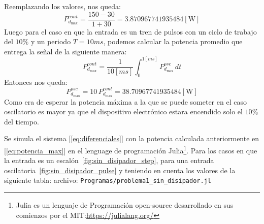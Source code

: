 \documentclass[10pt]{article}
\begin{document}
Reemplazando los valores, nos queda:
\begin{equation}
   P_{d_{\max}}^{cont} = \dfrac{150 - 30}{1 + 30} = 3.870967741935484 [\si{\watt}]
   \label{eq:potencia_max}
\end{equation}
Luego para el caso en que la entrada es un tren de pulsos con un ciclo de trabajo del $10\%$ y un periodo $T=10ms$, podemos calcular la potencia promedio
que entrega la señal de la siguiente manera:
\begin{equation}
   P_{d_{\max}}^{cont}=\frac{1}{10[\si{ms}]}\int_0^{1[\si{ms}]}P_{d_{\max}}^{osc}\,dt
\end{equation}
Entonces nos queda:
\begin{equation}
P_{d_{\max}}^{osc}=10\,P_{d_{\max}}^{cont}=38.70967741935484[\si{\watt}]
\end{equation}
Como era de esperar la potencia máxima a la que se puede someter en el caso oscilatorio es mayor ya que el dispositivo electrónico estara encendido solo el $10\%$
del tiempo.

Se simula el sistema [\ref{eq:diferenciales}] con la potencia calculada anteriormente en [\ref{eq:potencia_max}] en el lenguage de programación
Julia\footnote{Julia es un lenguaje de Programación open-source desarrollado en sus comienzos por el MIT:\url{https://julialang.org/}}. Para los casos en que la
entrada es un escalón~\ref{fig:sin_disipador_step}, para una entrada oscilatoria~\ref{fig:sin_disipador_pulse} y teniendo en cuenta los valores de la siguiente tabla:
archivo: \verb|Programas/problema1_sin_disipador.jl|
\end{document}
